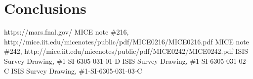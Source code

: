\documentclass[a4paper,11pt]{article}
\begin{document}
\section{Conclusions}

\begin{thebibliography}{9}
 https://mars.fnal.gov/
 MICE note \#216, http://mice.iit.edu/micenotes/public/pdf/MICE0216/MICE0216.pdf
 MICE note \#242, http://mice.iit.edu/micenotes/public/pdf/MICE0242/MICE0242.pdf
 ISIS Survey Drawing, \#1-SI-6305-031-01-D
 ISIS Survey Drawing, \#1-SI-6305-031-02-C
 ISIS Survey Drawing, \#1-SI-6305-031-03-C

\end{thebibliography}





\end{document}

